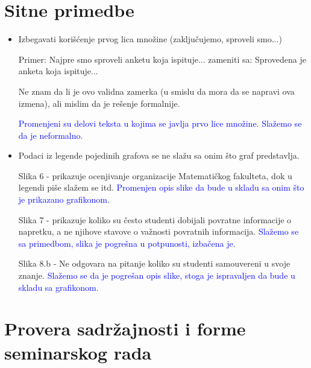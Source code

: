 \documentclass[a4paper]{report}
\newcommand{\odgovor}[1]{\textcolor{blue}{#1}}
\begin{document}
 
 \section{Sitne primedbe}
 
 \begin{itemize}
     \item Izbegavati korišćenje prvog lica množine (zaključujemo, sproveli smo...)
     
           Primer: Najpre smo sproveli anketu koja ispituje... zameniti sa: Sprovedena je anketa koja ispituje...
           
           Ne znam da li je ovo validna zamerka (u smislu da mora da se napravi ova izmena), ali mislim da je rešenje formalnije.
 
         \odgovor{Promenjeni su delovi teksta u kojima se javlja prvo lice množine. Slažemo se da je neformalno.}
           
     \item Podaci iz legende pojedinih grafova se ne slažu sa onim što graf predstavlja. 
 
           Slika 6 - prikazuje ocenjivanje organizacije Matematičkog fakulteta, dok u legendi piše slažem se itd.
         \odgovor{Promenjen opis slike da bude u skladu sa onim što je prikazano grafikonom.}
             
           Slika 7 - prikazuje koliko su često studenti dobijali povratne informacije o napretku, a ne njihove stavove o važnosti povratnih informacija. 
         \odgovor{Slažemo se sa primedbom, slika je pogrešna u potpunosti, izbačena je.}
 
           Slika 8.b - Ne odgovara na pitanje koliko su studenti samouvereni u svoje znanje.
         \odgovor{Slažemo se da je pogrešan opis slike, stoga je ispravaljen da bude u skladu sa grafikonom.}
         
 \end{itemize}
 
 
 \section{Provera sadržajnosti i forme seminarskog rada}
 
\end{document}
